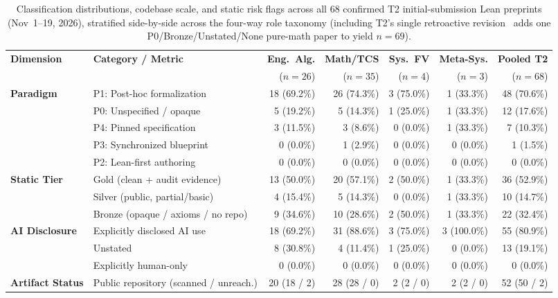 \documentclass[11pt,letterpaper]{article}
\begin{document}
\begin{table}[t]
\centering
\caption{Classification distributions, codebase scale, and static risk flags across all 68 confirmed T2 initial-submission Lean preprints (Nov~1--19, 2026), stratified side-by-side across the four-way role taxonomy (including T2's single retroactive revision~\cite{arxiv2611_07818} adds one P0/Bronze/Unstated/None pure-math paper to yield $n = 69$).}
\label{tab:distributions_15cat}
\scriptsize
\setlength{\tabcolsep}{3.0pt}
\begin{tabular}{llrrrrr}
\toprule
\textbf{Dimension} & \textbf{Category / Metric} & \textbf{Eng.\ Alg.} & \textbf{Math/TCS} & \textbf{Sys.\ FV} & \textbf{Meta-Sys.} & \textbf{Pooled T2} \\
 & & ($n=26$) & ($n=35$) & ($n=4$) & ($n=3$) & ($n=68$) \\
\midrule
\textbf{Paradigm} & P1: Post-hoc formalization & 18 (69.2\%) & 26 (74.3\%) & 3 (75.0\%) & 1 (33.3\%) & 48 (70.6\%) \\
 & P0: Unspecified / opaque & 5 (19.2\%) & 5 (14.3\%) & 1 (25.0\%) & 1 (33.3\%) & 12 (17.6\%) \\
 & P4: Pinned specification & 3 (11.5\%) & 3 (8.6\%) & 0 (0.0\%) & 1 (33.3\%) & 7 (10.3\%) \\
 & P3: Synchronized blueprint & 0 (0.0\%) & 1 (2.9\%) & 0 (0.0\%) & 0 (0.0\%) & 1 (1.5\%) \\
 & P2: Lean-first authoring & 0 (0.0\%) & 0 (0.0\%) & 0 (0.0\%) & 0 (0.0\%) & 0 (0.0\%) \\
\midrule
\textbf{Static Tier} & Gold (clean + audit evidence) & 13 (50.0\%) & 20 (57.1\%) & 2 (50.0\%) & 1 (33.3\%) & 36 (52.9\%) \\
 & Silver (public, partial/basic) & 4 (15.4\%) & 5 (14.3\%) & 0 (0.0\%) & 1 (33.3\%) & 10 (14.7\%) \\
 & Bronze (opaque / axioms / no repo) & 9 (34.6\%) & 10 (28.6\%) & 2 (50.0\%) & 1 (33.3\%) & 22 (32.4\%) \\
\midrule
\textbf{AI Disclosure} & Explicitly disclosed AI use & 18 (69.2\%) & 31 (88.6\%) & 3 (75.0\%) & 3 (100.0\%) & 55 (80.9\%) \\
 & Unstated & 8 (30.8\%) & 4 (11.4\%) & 1 (25.0\%) & 0 (0.0\%) & 13 (19.1\%) \\
 & Explicitly human-only & 0 (0.0\%) & 0 (0.0\%) & 0 (0.0\%) & 0 (0.0\%) & 0 (0.0\%) \\
\midrule
\textbf{Artifact Status} & Public repository (scanned / unreach.) & 20 (18 / 2) & 28 (28 / 0) & 2 (2 / 0) & 2 (2 / 0) & 52 (50 / 2) \\

\end{tabular}
\end{table}
\end{document}
